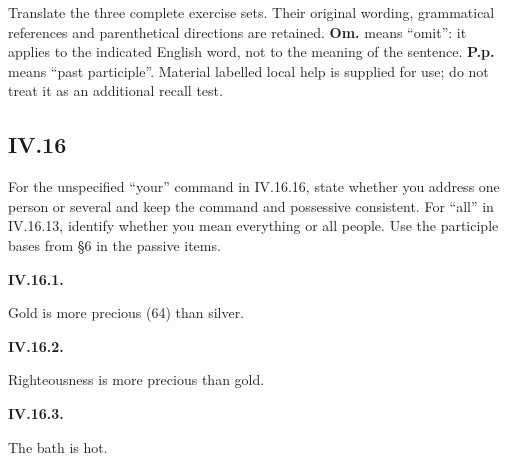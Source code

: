 Translate the three complete exercise sets. Their original wording, grammatical references and parenthetical directions are retained. \textbf{Om.} means “omit”: it applies to the indicated English word, not to the meaning of the sentence. \textbf{P.p.} means “past participle”. Material labelled local help is supplied for use; do not treat it as an additional recall test.

\subsection*{IV.16}

For the unspecified “your” command in IV.16.16, state whether you address one person or several and keep the command and possessive consistent. For “all” in IV.16.13, identify whether you mean everything or all people. Use the participle bases from §6 in the passive items.

\par\begin{minipage}{\linewidth}\raggedright
\textbf{IV.16.1.}

Gold is more precious (64) than silver.

\end{minipage}\par\addvspace{4pt}

\par\begin{minipage}{\linewidth}\raggedright
\textbf{IV.16.2.}

Righteousness is more precious than gold.

\end{minipage}\par\addvspace{4pt}

\par\begin{minipage}{\linewidth}\raggedright
\textbf{IV.16.3.}

The bath is hot.

\end{minipage}\par\addvspace{4pt}

